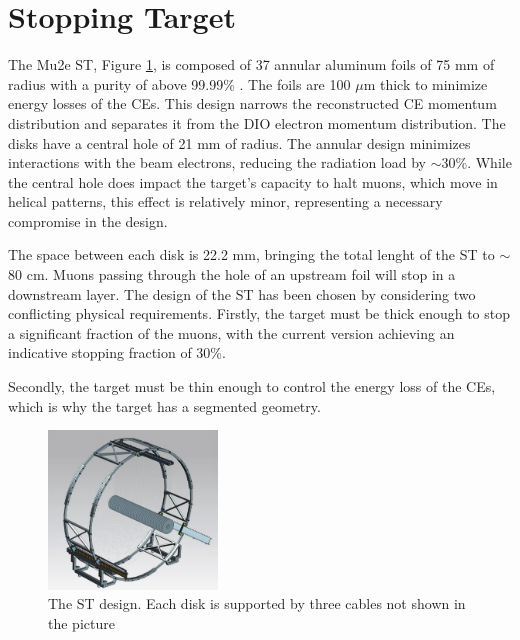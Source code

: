 \section{Stopping Target}
The Mu2e ST, Figure \ref{fig:ST}, is 
composed of 37 annular aluminum foils of 75 mm of radius with a purity of 
above 99.99\% \cite{bobbb}. The foils are 100 $\mu$m thick to minimize energy losses of the CEs. This design 
narrows the reconstructed CE momentum distribution 
and separates it from the DIO electron momentum distribution. 
The disks have a central hole of 21 mm of radius.
The annular design minimizes interactions with the beam electrons, reducing the radiation load by $\sim$30\%.
While the central hole does impact the target's capacity to halt muons, 
which move in helical patterns, this effect is relatively minor, 
representing a necessary compromise in the design.

The space between each disk is
22.2 mm, bringing the total lenght of the ST to $\sim$80 cm.
Muons passing through the hole of an upstream foil will stop in a downstream layer. 
The design of the ST has been chosen by considering two 
conflicting physical requirements. Firstly, the target must be thick enough 
to stop a significant fraction of the muons, with the current version achieving 
an indicative stopping fraction of 30\%.

Secondly, the target must be thin 
enough to control the energy loss of the CEs, which is why 
the target has a segmented geometry.
\begin{figure}[!h]
    \centering
    \includegraphics[width =0.4\textwidth]{figures/png/Screenshot_20240706_122723.png}
    \caption[The Stopping Target design.]{The ST design. 
    Each disk is supported by three cables not shown in the picture }
    \label{fig:ST}
\end{figure}

